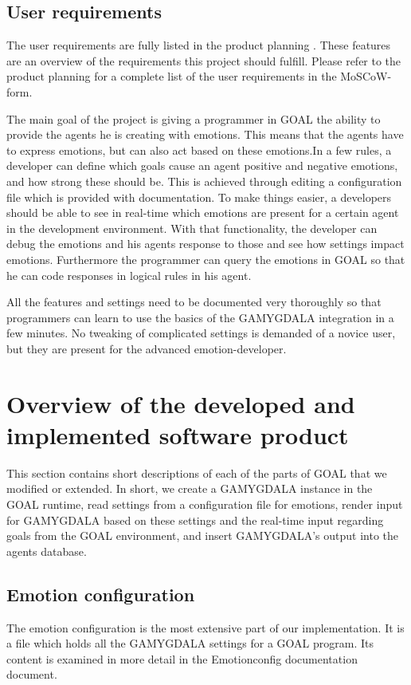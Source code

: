 \documentclass[11pt]{article}
\begin{document}
\subsection{User requirements}
The user requirements are fully listed in the product planning \cite{productplan}. These features are an overview of the requirements this project should fulfill. Please refer to the product planning for a complete list of the user requirements in the \gls{MoSCoW}-form.\cite{MoSCoW}\par
The main goal of the project is giving a programmer in GOAL the ability to provide the agents he is creating with emotions. This means that the agents have to express emotions, but can also act based on these emotions.In a few rules, a developer can define which goals cause an agent positive and negative emotions, and how strong these should be. This is achieved through editing a configuration file which is provided with documentation. To make things easier, a developers should be able to see in real-time which emotions are present for a certain agent in the development environment. With that functionality, the developer can debug the emotions and his agents response to those and see how settings impact emotions. Furthermore the programmer can query the emotions in GOAL so that he can code responses in logical rules in his agent. \par All the features and settings need to be documented very thoroughly so that programmers can learn to use the basics of the GAMYGDALA integration in a few minutes. No tweaking of complicated settings is demanded of a novice user, but they are present for the advanced emotion-developer.


\section{Overview of the developed and implemented software product}
This section contains short descriptions of each of the parts of GOAL\cite{GOAL Env} that we modified or extended. In short, we create a GAMYGDALA instance in the GOAL runtime, read settings from a configuration file for emotions, render input for GAMYGDALA based on these settings and the real-time input regarding goals from the GOAL environment, and insert GAMYGDALA's output into the agents database.

\subsection{Emotion configuration}
The emotion configuration\cite{emotionconfig} is the most extensive part of our implementation. It is a file which holds all the GAMYGDALA settings for a GOAL program. Its content is examined in more detail in the Emotionconfig documentation document.
\end{document}
